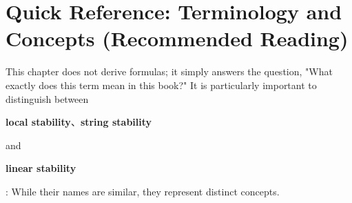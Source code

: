 \documentclass[11pt,a4paper,openany]{book}
\numberwithin{equation}{chapter}
\numberwithin{figure}{chapter}
\numberwithin{table}{chapter}
\begin{document}
\clearpage

\tableofcontents
\clearpage
{}
{}
\listoffigures
\clearpage
{}
{}
\listoftables
\clearpage

\chapter*{Quick Reference: Terminology and Concepts (Recommended Reading)}
\label{sec:glossary}



This chapter does not derive formulas; it simply answers the question, "What exactly does this term mean in this book?" It is particularly important to distinguish between

\textbf{local stability}、\textbf{string stability}

and

\textbf{linear stability}

: While their names are similar, they represent distinct concepts.
\end{document}
